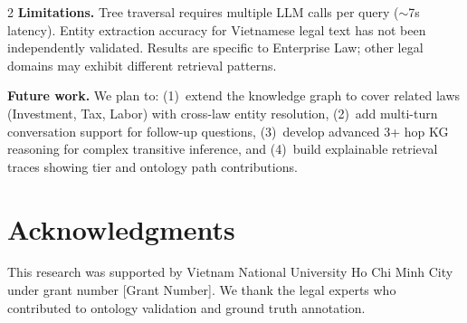 \documentclass[11pt,a4paper]{article}
\begin{document}
\begin{multicols}{2}
\textbf{Limitations.} Tree traversal requires multiple LLM calls per query ($\sim$7s latency). Entity extraction accuracy for Vietnamese legal text has not been independently validated. Results are specific to Enterprise Law; other legal domains may exhibit different retrieval patterns.

\textbf{Future work.} We plan to: (1)~extend the knowledge graph to cover related laws (Investment, Tax, Labor) with cross-law entity resolution, (2)~add multi-turn conversation support for follow-up questions, (3)~develop advanced 3+ hop KG reasoning for complex transitive inference, and (4)~build explainable retrieval traces showing tier and ontology path contributions.

\section*{Acknowledgments}

This research was supported by Vietnam National University Ho Chi Minh City under grant number [Grant Number]. We thank the legal experts who contributed to ontology validation and ground truth annotation.

\end{multicols}
\end{document}
